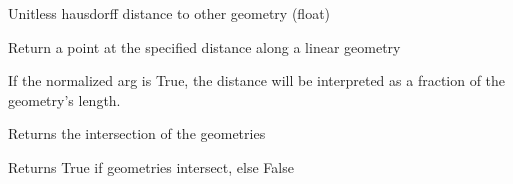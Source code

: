 \documentclass[letterpaper,10pt,english]{sphinxmanual}
\begin{document}
\begin{fulllineitems}
\begin{fulllineitems}
\end{fulllineitems}


\begin{fulllineitems}
\label{\detokenize{reference:taipanPyRouter.ESegment.hausdorff_distance}}
Unitless hausdorff distance to other geometry (float)

\end{fulllineitems}


\begin{fulllineitems}
\label{\detokenize{reference:taipanPyRouter.ESegment.impl}}
\end{fulllineitems}


\begin{fulllineitems}
\label{\detokenize{reference:taipanPyRouter.ESegment.interpolate}}
Return a point at the specified distance along a linear geometry

If the normalized arg is True, the distance will be interpreted as a
fraction of the geometry’s length.

\end{fulllineitems}


\begin{fulllineitems}
\label{\detokenize{reference:taipanPyRouter.ESegment.intersection}}
Returns the intersection of the geometries

\end{fulllineitems}


\begin{fulllineitems}
\label{\detokenize{reference:taipanPyRouter.ESegment.intersects}}
Returns True if geometries intersect, else False


\end{fulllineitems}
\end{fulllineitems}
\end{document}
